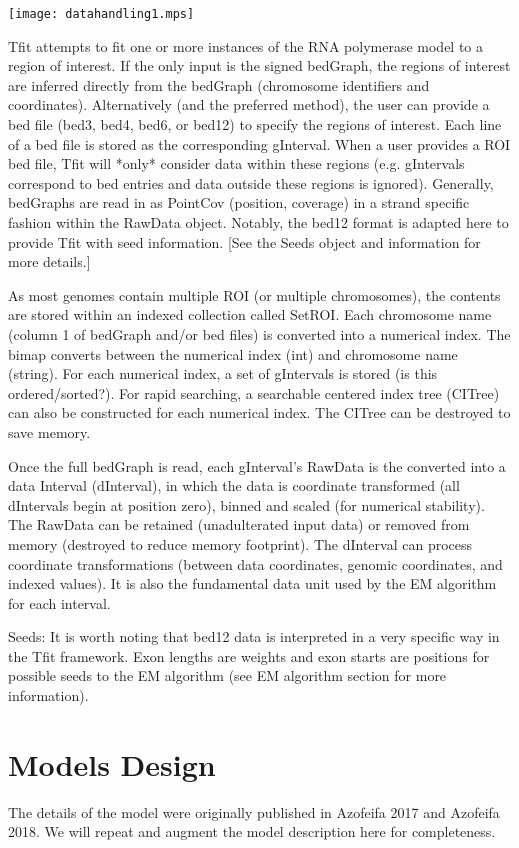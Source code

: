 \documentclass[11pt]{article}
\begin{document}
\texttt{[image: datahandling1.mps]}

Tfit attempts to fit one or more instances of the RNA polymerase model to a 
region of interest.  If the only input is the signed bedGraph, the regions of 
interest are inferred directly from the bedGraph (chromosome identifiers 
and coordinates).  Alternatively (and the preferred method), the user can 
provide a bed file (bed3, bed4, bed6, or bed12) to specify the regions of 
interest.  Each line of a bed file is stored as the corresponding gInterval.
When a user provides a ROI bed file, Tfit will *only* consider data within 
these regions (e.g. gIntervals correspond to bed entries and data outside these 
regions is ignored).  Generally, bedGraphs are read in as PointCov (position, 
coverage) in a strand specific fashion within the RawData object.  Notably,
the bed12 format is adapted here to provide Tfit with seed information.  [See
the Seeds object and information for more details.]

As most genomes contain multiple ROI (or multiple chromosomes), the contents
are stored within an indexed collection called SetROI.  Each chromosome name 
(column 1 of bedGraph and/or bed files) is converted into a numerical index.
The bimap converts between the numerical index (int) and chromosome name (string).
For each numerical index, a set of gIntervals is stored (is this ordered/sorted?). 
For rapid searching, a searchable centered index tree (CITree) can also be 
constructed for each numerical index.  The CITree can be destroyed to save 
memory.  

Once the full bedGraph is read, each gInterval's RawData is the converted into
a data Interval (dInterval), in which the data is coordinate transformed (all
dIntervals begin at position zero), binned and scaled (for numerical
stability).  The RawData can be retained (unadulterated input data) or removed 
from memory (destroyed to reduce memory footprint).  The dInterval can 
process coordinate transformations (between data coordinates, genomic 
coordinates, and indexed values).  It is also the fundamental data unit 
used by the EM algorithm for each interval.

Seeds: It is worth noting that bed12 data is interpreted in a very specific way
in the Tfit framework.   Exon lengths are weights and exon starts are 
positions for possible seeds to the EM algorithm (see EM algorithm 
section for more information).

\clearpage
\section{Models Design}
The details of the model were originally published in Azofeifa 2017 and
Azofeifa 2018.  We will repeat and augment the model description here for
completeness.  
\end{document}
